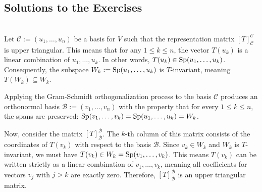 \subsection{Solutions to the Exercises}
\label{sec:solutions_spectral_theorems}

\begin{exercisesolution}
\label{sol:gram_schmidt_keeps_triangular}~\\
Let $\mathcal{C} := (u_1, \dots, u_n)$ be a basis for $V$ such that the representation matrix $[T]_{\mathcal{C}}^{\mathcal{C}}$ is upper triangular. This means that for any $1 \leq k \leq n$, the vector $T(u_k)$ is a linear combination of $u_1, \dots, u_k$. In other words, $T(u_k) \in \operatorname{Sp}(u_1, \dots, u_k)$. Consequently, the subspace $W_k := \operatorname{Sp}(u_1, \dots, u_k)$ is $T$-invariant, meaning $T(W_k) \subseteq W_k$.

Applying the Gram-Schmidt orthogonalization process to the basis $\mathcal{C}$ produces an orthonormal basis $\mathcal{B} := (v_1, \dots, v_n)$ with the property that for every $1 \leq k \leq n$, the spans are preserved: $\operatorname{Sp}(v_1, \dots, v_k) = \operatorname{Sp}(u_1, \dots, u_k) = W_k$. 

Now, consider the matrix $[T]_{\mathcal{B}}^{\mathcal{B}}$. The $k$-th column of this matrix consists of the coordinates of $T(v_k)$ with respect to the basis $\mathcal{B}$. Since $v_k \in W_k$ and $W_k$ is $T$-invariant, we must have $T(v_k) \in W_k = \operatorname{Sp}(v_1, \dots, v_k)$. This means $T(v_k)$ can be written strictly as a linear combination of $v_1, \dots, v_k$, meaning all coefficients for vectors $v_j$ with $j > k$ are exactly zero. Therefore, $[T]_{\mathcal{B}}^{\mathcal{B}}$ is an upper triangular matrix.
\end{exercisesolution}

